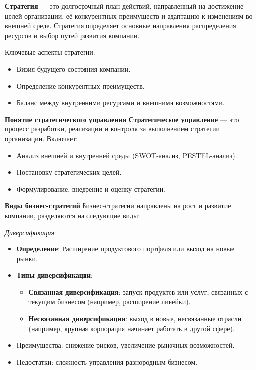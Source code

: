 \textbf{Стратегия} --- это долгосрочный план действий, направленный на достижение целей организации, её конкурентных преимуществ и адаптацию к изменениям во внешней среде. Стратегия определяет основные направления распределения ресурсов и выбор путей развития компании.

Ключевые аспекты стратегии:
\begin{itemize}
    \item Визия будущего состояния компании.
    \item Определение конкурентных преимуществ.
    \item Баланс между внутренними ресурсами и внешними возможностями.
\end{itemize}

\textbf{Понятие стратегического управления}
\textbf{Стратегическое управление} --- это процесс разработки, реализации и контроля за выполнением стратегии организации. Включает:
\begin{itemize}
    \item Анализ внешней и внутренней среды (SWOT-анализ, PESTEL-анализ).
    \item Постановку стратегических целей.
    \item Формулирование, внедрение и оценку стратегии.
\end{itemize}

\textbf{Виды бизнес-стратегий}
Бизнес-стратегии направлены на рост и развитие компании, разделяются на следующие виды:

\textit{Диверсификация}
\begin{itemize}
    \item \textbf{Определение}: Расширение продуктового портфеля или выход на новые рынки.
    \item \textbf{Типы диверсификации}:
    \begin{itemize}
        \item \textbf{Связанная диверсификация}: запуск продуктов или услуг, связанных с текущим бизнесом (например, расширение линейки).
        \item \textbf{Несвязанная диверсификация}: выход в новые, несвязанные отрасли (например, крупная корпорация начинает работать в другой сфере).
    \end{itemize}
    \item Преимущества: снижение рисков, увеличение рыночных возможностей.
    \item Недостатки: сложность управления разнородным бизнесом.
\end{itemize}

